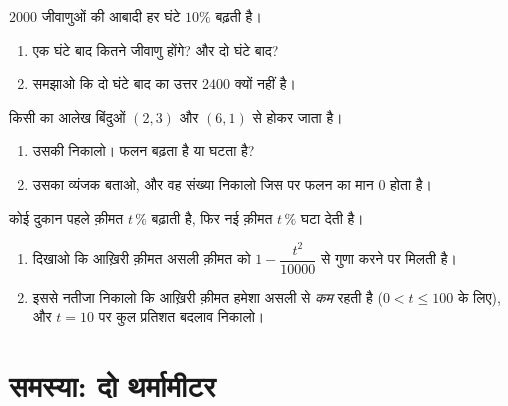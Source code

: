 \begin{exercise}[$\star\star$]\label{exo:g9:linfunc:8}
$2000$ जीवाणुओं की आबादी हर घंटे $10\%$ बढ़ती है।
\begin{enumerate}
  \item एक घंटे बाद कितने जीवाणु होंगे? और दो घंटे बाद?
  \item समझाओ कि दो घंटे बाद का उत्तर $2400$ क्यों नहीं है।
\end{enumerate}
\end{exercise}

\begin{exercise}[$\star\star$]\label{exo:g9:linfunc:9}
किसी  का आलेख बिंदुओं $(2, 3)$ और $(6, 1)$ से होकर जाता है।
\begin{enumerate}
  \item उसकी  निकालो। फलन बढ़ता है या घटता है?
  \item उसका व्यंजक बताओ, और वह संख्या निकालो जिस पर फलन का मान $0$
        होता है।
\end{enumerate}
\end{exercise}

\begin{exercise}[$\star\star\star$]\label{exo:g9:linfunc:10}
कोई दुकान पहले क़ीमत $t\,\%$ बढ़ाती है, फिर नई क़ीमत $t\,\%$ घटा देती
है।
\begin{enumerate}
  \item दिखाओ कि आख़िरी क़ीमत असली क़ीमत को $1 - \dfrac{t^2}{10000}$ से
        गुणा करने पर मिलती है।
  \item इससे नतीजा निकालो कि आख़िरी क़ीमत हमेशा असली से \emph{कम} रहती
        है ($0 < t \leq 100$ के लिए), और $t = 10$ पर कुल प्रतिशत
        बदलाव निकालो।
\end{enumerate}
\end{exercise}

\section{समस्या: दो थर्मामीटर}

